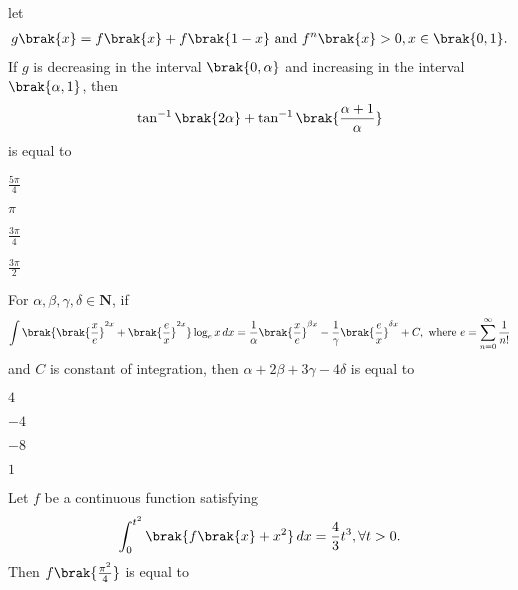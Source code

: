     \item 
    let 
    \begin{align*}
        g\brak{x} = f\brak{x} + f\brak{1 - x} \text{ and } f^n\brak{x} > 0, x \in \brak{0, 1}.
    \end{align*}
    If $g$ is decreasing in the interval $\brak{0, \alpha}$ and increasing in the interval $\brak{\alpha, 1}$, then 
    \begin{align*}
        \tan^{-1} {\brak{2\alpha}} + \tan^{-1} {\brak{\frac{\alpha + 1}{\alpha}}}
    \end{align*}
    is equal to

    \hfill{}
    
    \begin{enumerate}
    \begin{multicols}{4}
        \item $\frac{5\pi}{4}$
        \item $\pi$
        \item $\frac{3\pi}{4}$
        \item $\frac{3\pi}{2}$
    \end{multicols}
    \end{enumerate}

    \item 
    For $\alpha, \beta, \gamma, \delta \in \mathbf{N}$, if
    \begin{align*}
         \int \brak{\brak{\frac{x}{e}}^{2x} + \brak{\frac{e}{x}}^{2x}} \log_ex \, dx = \frac{1}{\alpha}\brak{\frac{x}{e}}^{\beta x} - \frac{1}{\gamma}\brak{\frac{e}{x}}^{\delta x} + C, \text{ where } e = \sum_{n = 0}^\infty \frac{1}{n!}
    \end{align*}
    and $C$ is constant of integration, then $\alpha + 2\beta + 3\gamma - 4\delta$ is equal to

    \hfill{}

    \begin{enumerate}
    \begin{multicols}{4}
        \item $4$
        \item $-4$
        \item $-8$
        \item $1$
    \end{multicols}
    \end{enumerate}

    \item 
    Let $f$ be a continuous function satisfying
    \begin{align*}
        \int_0^{t^2} \brak{f\brak{x} + x^2} \, dx = \frac{4}{3}t^3, \forall t > 0. 
    \end{align*}
    Then $f\brak{\frac{\pi^2}{4}}$ is equal to

